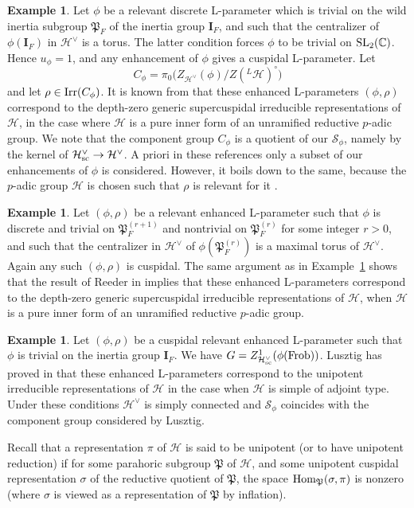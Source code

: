 \documentclass[11pt]{amsart}
\theoremstyle{definition}
\newtheorem{ex}[thm]{Example}
\newcommand{\bI}{{\mathbf I}}
\newcommand{\mf}{\mathfrak}
\newcommand{\C}{\mathbb C}
\def\Hom{{\rm Hom}}
\def\Irr{{\rm Irr}}
\def\SL{{\rm SL}}
\def\cS{{\mathcal S}}
\def\cH{{\mathcal H}}
\def\fP{{\mathfrak P}}
\def\Fr{{\rm Frob}}
\def\sc{{\rm sc}}
\begin{document}
\begin{ex} \label{ex: cusp 1}
Let $\phi$ be a relevant discrete L-parameter which is trivial on the wild inertia subgroup 
$\mf P_F$ of the inertia group $\bI_F$, and such that the centralizer of $\phi (\bI_F)$ 
in $\cH^\vee$ is a torus. The latter condition forces $\phi$ to be trivial on $\SL_2(\C)$. 
Hence $u_\phi=1$, and any enhancement of $\phi$ gives a cuspidal L-parameter. Let
\[
C_\phi = \pi_0 \big( Z_{\cH^\vee}(\phi) / Z({}^L \cH)^\circ \big)
\]
and let $\rho \in \Irr (C_\phi)$. It is known from \cite{DeRe} that
these enhanced L-parameters $(\phi,\rho)$ correspond to the depth-zero generic 
supercuspidal irreducible representations of $\cH$, in the case where $\cH$ is a pure inner 
form of an unramified reductive $p$-adic group. We note that the component group 
$C_\phi$ is a quotient of our $\cS_\phi$, namely by the kernel of $\cH^\vee_{\sc} \to \cH^\vee$.
A priori in these references only a subset of our enhancements of $\phi$ is considered. However, 
it boils down to the same, because the $p$-adic group $\cH$ is chosen such that $\rho$ 
is relevant for it \cite[\S 2]{DeRe}.
\end{ex}

\begin{ex} \label{ex: very cusp} 
Let $(\phi,\rho)$ be a relevant enhanced L-parameter such that 
$\phi$ is discrete and trivial on $\mf P_F^{(r+1)}$ and nontrivial on $\mf P_F^{(r)}$ for some 
integer $r>0$, and such that the centralizer in $\cH^\vee$ of $\phi(\mf P_F^{(r)})$ is a 
maximal torus of $\cH^\vee$. Again any such $(\phi,\rho)$ is cuspidal. The same argument as in 
Example~\ref{ex: cusp 1} shows that the result of Reeder in \cite[\S 6]{Ree3} implies that 
these enhanced L-parameters correspond to the depth-zero generic 
supercuspidal irreducible representations of $\cH$, when $\cH$ is a pure inner 
form of an unramified reductive $p$-adic group.
\end{ex}

\begin{ex} \label{ex: cusp 2}
Let $(\phi,\rho)$ be a cuspidal relevant enhanced L-parameter such that $\phi$ is 
trivial on the inertia group $\bI_F$. We have $G = Z^1_{\cH^\vee_\sc}(\phi (\Fr))$.
Lusztig has proved in \cite{Lus3} that these enhanced L-parameters correspond 
to the unipotent irreducible representations of $\cH$ in the case when $\cH$ 
is simple of adjoint type. Under these conditions $\cH^\vee$ is simply connected
and $\cS_\phi$ coincides with the component group considered by Lusztig. 

Recall that a 
representation $\pi$ of $\cH$ is said to be unipotent (or to have unipotent reduction) 
if for some parahoric subgroup $\fP$ of $\cH$, and some unipotent cuspidal representation 
$\sigma$ of the reductive quotient of $\fP$, the space $\Hom_\fP (\sigma,\pi)$ is nonzero 
(where $\sigma$ is viewed as a representation of $\fP$ by inflation).  
\end{ex}
\end{document}
